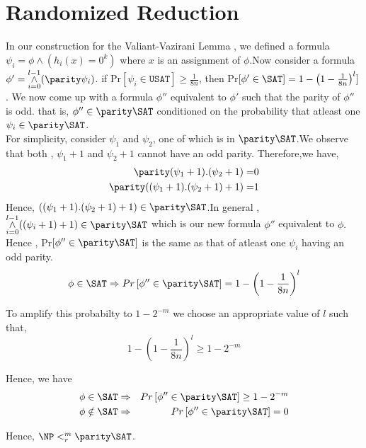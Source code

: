 \section{Randomized Reduction}

	In our construction for the Valiant-Vazirani Lemma , we defined a formula $\psi_i = \phi \wedge (h_i(x)= 0^k)$
where $x$ is an assignment of $\phi$.Now consider a formula $\phi' = \overset{l-1}{\underset{i = 0} \wedge } (\parity
\psi_i)$. if Pr$\left[\psi_i \in \texttt{USAT} \right] \geq \frac{1}{8n}$, then Pr$\left[ \phi' \in \SAT\right] = 1 -
\left(1 - \frac{1}{8n } \right)^l]$. We now come up with a formula $\phi''$ equivalent to $\phi'$ such that the parity
of $\phi''$  is odd. that is, $\phi'' \in \parity \SAT$ conditioned on the probability that atleast one $\psi_i \in
\parity \SAT $.\\
For simplicity, consider $\psi_1$ and $\psi_2$, one of which is in $\parity \SAT$.We observe that both ,
$\psi_1 + 1$ and $\psi_2 + 1$ cannot have an odd parity. Therefore,we have, 
\begin{align*}
\parity(\psi_1 + 1) .(\psi_2 + 1) =& 0\\
\parity((\psi_1 + 1) .(\psi_2 + 1)+ 1) =& 1 
\end{align*}
Hence, $((\psi_1 + 1) .(\psi_2 + 1)+ 1) \in \parity \SAT$.In general , 
$\overset{l-1}{ \underset{i = 0}\wedge} ((\psi_i + 1)+ 1) \in \parity \SAT$ which is our new formula $\phi''$
equivalent to $\phi.$ Hence , Pr$\left[\phi'' \in \parity \SAT \right]$ is the same as that of atleast one $\psi_i$
having an odd parity.
 \[\phi \in \SAT \Rightarrow Pr \left[\phi'' \in \parity \SAT \right] =1 -\left(1 - \frac{1}{8n }\right)^l \]

To amplify this probabilty to $1 - 2^{-m} $ we choose an appropriate value of $l$ such that,
\[1 -\left(1 - \frac{1}{8n }\right)^l \geq 1 - 2^{-m} \]

Hence, we have 
\begin{eqnarray*}
 \phi \in \SAT & \Rightarrow &  Pr\left[\phi'' \in \parity \SAT \right]\geq  1 - 2^{-m} \\
 \phi \notin \SAT & \Rightarrow & Pr\left[\phi'' \in \parity \SAT \right] = 0 
\end{eqnarray*}

Hence, $\NP <^m_r \parity \SAT$.
 

